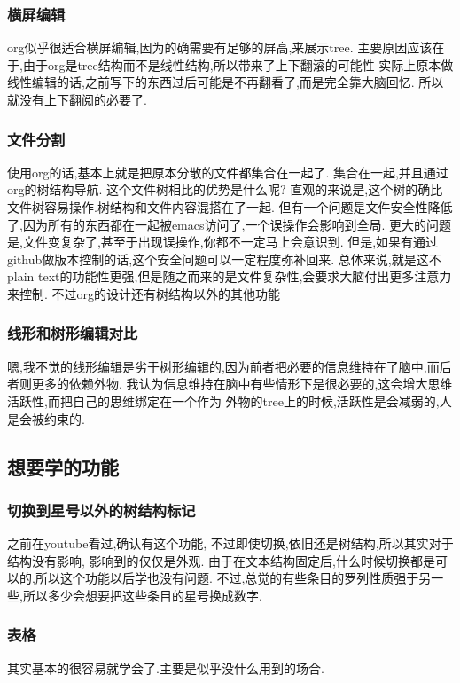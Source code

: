 \documentclass[12pt,a4paper]{article}
\begin{document}
\subsubsection{横屏编辑}
\label{sec:orgheadline32}
    org似乎很适合横屏编辑,因为的确需要有足够的屏高,来展示tree.
主要原因应该在于,由于org是tree结构而不是线性结构,所以带来了上下翻滚的可能性
实际上原本做线性编辑的话,之前写下的东西过后可能是不再翻看了,而是完全靠大脑回忆.
所以就没有上下翻阅的必要了.
\subsubsection{文件分割}
\label{sec:orgheadline33}
使用org的话,基本上就是把原本分散的文件都集合在一起了.
集合在一起,并且通过org的树结构导航.
这个文件树相比的优势是什么呢?
直观的来说是,这个树的确比文件树容易操作.树结构和文件内容混搭在了一起.
但有一个问题是文件安全性降低了,因为所有的东西都在一起被emacs访问了,一个误操作会影响到全局.
更大的问题是,文件变复杂了,甚至于出现误操作,你都不一定马上会意识到.
但是,如果有通过github做版本控制的话,这个安全问题可以一定程度弥补回来.
总体来说,就是这不plain text的功能性更强,但是随之而来的是文件复杂性,会要求大脑付出更多注意力来控制.
不过org的设计还有树结构以外的其他功能
\subsubsection{线形和树形编辑对比}
\label{sec:orgheadline34}
嗯,我不觉的线形编辑是劣于树形编辑的,因为前者把必要的信息维持在了脑中,而后者则更多的依赖外物.
我认为信息维持在脑中有些情形下是很必要的,这会增大思维活跃性,而把自己的思维绑定在一个作为
外物的tree上的时候,活跃性是会减弱的,人是会被约束的.
\subsection{想要学的功能}
\label{sec:orgheadline40}
\subsubsection{切换到星号以外的树结构标记}
\label{sec:orgheadline36}
之前在youtube看过,确认有这个功能,
不过即使切换,依旧还是树结构,所以其实对于结构没有影响,
影响到的仅仅是外观.
由于在文本结构固定后,什么时候切换都是可以的,所以这个功能以后学也没有问题.
不过,总觉的有些条目的罗列性质强于另一些,所以多少会想要把这些条目的星号换成数字.
\subsubsection{表格}
\label{sec:orgheadline37}
其实基本的很容易就学会了.主要是似乎没什么用到的场合.
\end{document}
